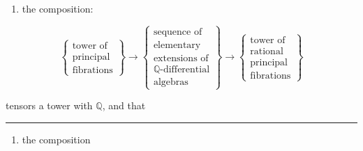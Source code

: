 \documentclass[
  english,
  a3paper,
  a3paper]{extarticle}
\providecommand{\tightlist}{%
  \setlength{\itemsep}{0pt}\setlength{\parskip}{0pt}}
\begin{document}
\begin{enumerate}
\def\labelenumi{\arabic{enumi})}
\tightlist
\item
  the composition:
\end{enumerate}

\[\left\{\begin{array}{c}\text{tower of}\\\text{principal}\\\text{fibrations}\end{array}\right\}\longrightarrow\left\{\begin{array}{c}\text{sequence of}\\\text{elementary}\\\text{extensions of}\\\mathbb Q\text{-differential}\\\text{algebras}\end{array}\right\}\longrightarrow\left\{\begin{array}{c}\text{tower of}\\\text{rational}\\\text{principal}\\\text{fibrations}\end{array}\right\}\]

tensors a tower with \(\mathbb Q\), and that

\clearpage



\par

\vspace{0.7mm}\hrule\vspace{1.6mm}

\fontsize{9}{11}\selectfont

\begin{enumerate}
\def\labelenumi{\arabic{enumi})}
\setcounter{enumi}{1}
\tightlist
\item
  the composition
\end{enumerate}
\end{document}
